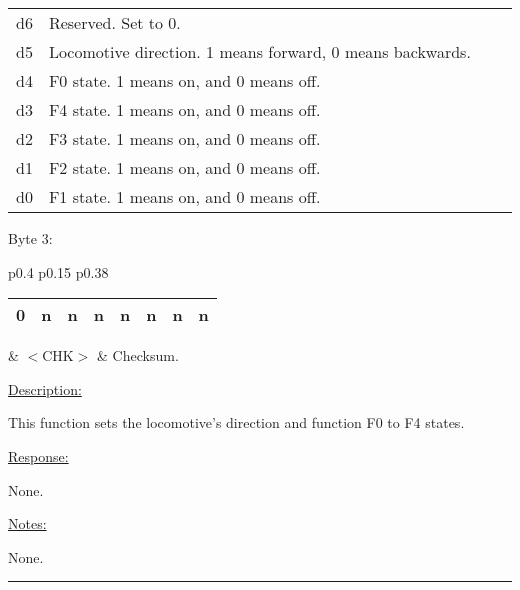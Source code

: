 \begin{tabular}{p{0.05\linewidth} p{0.95\linewidth}} 
d6 & Reserved. Set to 0.\\
d5 & Locomotive direction. 1 means forward, 0 means backwards.\\
d4 & F0 state. 1 means on, and 0 means off.\\
d3 & F4 state. 1 means on, and 0 means off.\\
d2 & F3 state. 1 means on, and 0 means off.\\
d1 & F2 state. 1 means on, and 0 means off.\\
d0 & F1 state. 1 means on, and 0 means off.\\
\end{tabular}

Byte 3:

\begin{tabular}{p{0.4\linewidth} p{0.15\linewidth} p{0.38\linewidth}} 

\begin{tabular}{|p{0.3cm}|p{0.3cm}|p{0.3cm}|p{0.3cm}|p{0.3cm}|p{0.3cm}|p{0.3cm}|p{0.3cm}|}
\hline
0 & n & n & n & n & n & n & n\\
\hline
\end{tabular}
& $<$CHK$>$ & Checksum.
\end{tabular}

\underline{Description:}

This function sets the locomotive's direction and function F0 to F4 states.

\underline{Response:} 

None.

\underline{Notes:} 

None.

\rule{15.1cm}{0.4pt}
